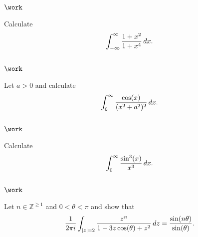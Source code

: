 \hypertarget{work-44}{%
\subsection{\texorpdfstring{\(\work\)}{\textbackslash work}}\label{work-44}}

\begin{problem}[?]

Calculate
\begin{align*}
\int_{-\infty}^\infty {1+x^2 \over 1+x^4}\, dx
.\end{align*}

\end{problem}

\hypertarget{work-45}{%
\subsection{\texorpdfstring{\(\work\)}{\textbackslash work}}\label{work-45}}

\begin{problem}[?]

Let \(a>0\) and calculate
\begin{align*}
\int_0^\infty {\cos(x) \over (x^2 + a^2)^2}\, dx
.\end{align*}

\end{problem}

\hypertarget{work-46}{%
\subsection{\texorpdfstring{\(\work\)}{\textbackslash work}}\label{work-46}}

\begin{problem}[?]

Calculate
\begin{align*}
\int_0^\infty {\sin^3(x) \over x^3} \, dx
.\end{align*}

\end{problem}

\hypertarget{work-47}{%
\subsection{\texorpdfstring{\(\work\)}{\textbackslash work}}\label{work-47}}

\begin{problem}[?]

Let \(n\in {\mathbb{Z}}^{\geq 1}\) and \(0<\theta<\pi\) and show that
\begin{align*}
{1\over 2\pi i} \int_{{\left\lvert {z} \right\rvert} = 2} {z^n \over 1 -3z\cos(\theta) + z^2} \,dz = {\sin(n\theta) \over \sin(\theta)}
.\end{align*}

\end{problem}

